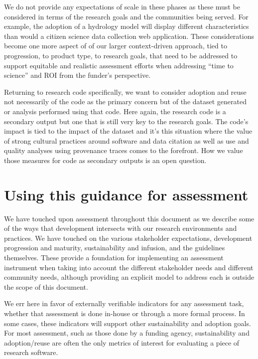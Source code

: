 \documentclass{article}
\begin{document}
We do not provide any expectations of scale in these phases as these must be considered in terms of the research goals and the communities being served. For example, the adoption of a hydrology model will display different characteristics than would a citizen science data collection web application. These considerations become one more aspect of of our larger context-driven approach, tied to progression, to product type, to research goals, that need to be addressed to support equitable and realistic assessment efforts when addressing “time to science” and ROI from the funder’s perspective. 
 
Returning to research code specifically, we want to consider adoption and reuse not necessarily of the code as the primary concern but of the dataset generated or analysis performed using that code. Here again, the research code is a secondary output but one that is still very key to the research goals. The code’s impact is tied to the impact of the dataset and it’s this situation where the value of strong cultural practices around software and data citation as well as use and quality analyses using provenance traces \autocite{car_data_2016} comes to the forefront. How we value those measures for code as secondary outputs is an open question.

\section{Using this guidance for assessment}
We have touched upon assessment throughout this document as we describe some of the ways that development intersects with our research environments and practices. We have touched on the various stakeholder expectations, development progression and maturity, sustainability and infusion, and the guidelines themselves. These provide a foundation for implementing an assessment instrument when taking into account the different stakeholder needs and different community needs, although providing an explicit model to address each is outside the scope of this document.
 
We err here in favor of externally verifiable indicators for any assessment task, whether that assessment is done in-house or through a more formal process. In some cases, these indicators will support other sustainability and adoption goals. For most assessment, such as those done by a funding agency, sustainability and adoption/reuse are often the only metrics of interest for evaluating a piece of research software.
 
\end{document}
